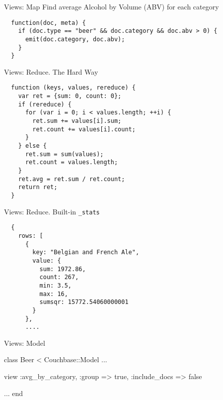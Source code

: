\documentclass[aspectratio=43]{beamer}
\begin{document}
\begin{frame}[fragile]{Views: Map}
  Find average Alcohol by Volume (ABV) for each category

  \begin{verbatim}
  function(doc, meta) {
    if (doc.type == "beer" && doc.category && doc.abv > 0) {
      emit(doc.category, doc.abv);
    }
  }
  \end{verbatim}
\end{frame}

\begin{frame}[fragile]{Views: Reduce. The Hard Way}
  \begin{verbatim}
  function (keys, values, rereduce) {
    var ret = {sum: 0, count: 0};
    if (rereduce) {
      for (var i = 0; i < values.length; ++i) {
        ret.sum += values[i].sum;
        ret.count += values[i].count;
      }
    } else {
      ret.sum = sum(values);
      ret.count = values.length;
    }
    ret.avg = ret.sum / ret.count;
    return ret;
  }
  \end{verbatim}
\end{frame}


\begin{frame}[fragile]{Views: Reduce. Built-in \texttt{\_stats}}
  \begin{verbatim}
  {
    rows: [
      {
        key: "Belgian and French Ale",
        value: {
          sum: 1972.86,
          count: 267,
          min: 3.5,
          max: 16,
          sumsqr: 15772.54060000001
        }
      },
      ....
  \end{verbatim}
\end{frame}

\begin{frame}[fragile]{Views: Model}
  \begin{semiverbatim}
  class Beer < Couchbase::Model
    ...

    view :avg\_by\_category, \alert<2>{:group => true},
                           :include\_docs => false

    ...
  end
  \end{semiverbatim}
\end{frame}
\end{document}
